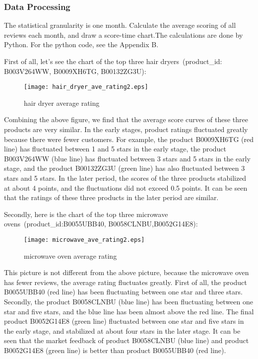 \documentclass{mcmthesis}
\begin{document}
	\subsubsection{Data Processing}
	
	The statistical granularity is one month. Calculate the average scoring of all reviews each month, and draw a score-time chart.The calculations are done by Python. For the python code, see the Appendix B.
	
	First of all, let's see the chart of the top three hair dryers\ (product\_id: B003V264WW, B0009XH6TG, B00132ZG3U):
	
	\begin{figure}[H]
		\small
		\centering
		\texttt{[image: hair\_dryer\_ave\_rating2.eps]}
		\caption{hair dryer average rating} \label{fig:hair dryer average rating}
	\end{figure}
	
	Combining the above figure, we find that the average score curves of these three products are very similar. In the early stages, product ratings fluctuated greatly because there were fewer customers. For example, the product B0009XH6TG (red line) has fluctuated between 1 and 5 stars in the early stage, the product B003V264WW (blue line) has fluctuated between 3 stars and 5 stars in the early stage, and the product B00132ZG3U (green line) has also fluctuated between 3 stars and 5 stars. In the later period, the scores of the three products stabilized at about 4 points, and the fluctuations did not exceed 0.5 points. It can be seen that the ratings of these three products in the later period are similar.
	
	Secondly, here is the chart of the top three microwave ovens\    (product\_id:B0055UBB40, B0058CLNBU,B0052G14E8):
	
	\begin{figure}[H]
		\small
		\centering
		\texttt{[image: microwave\_ave\_rating2.eps]}
		\caption{microwave oven average rating} \label{fig:micorwave average rating}
	\end{figure}
	
	This picture is not different from the above picture, because the microwave oven has fewer reviews, the average rating fluctuates greatly. First of all, the product B0055UBB40 (red line) has been fluctuating between one star and three stars. Secondly, the product B0058CLNBU (blue line) has been fluctuating between one star and five stars, and the blue line has been almost above the red line. The final product B0052G14E8 (green line) fluctuated between one star and five stars in the early stage, and stabilized at about four stars in the later stage. It can be seen that the market feedback of product B0058CLNBU (blue line) and product B0052G14E8 (green line) is better than product B0055UBB40 (red line).
	
\end{document}
